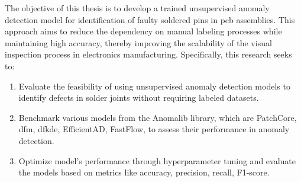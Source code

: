 The objective of this thesis is to develop a trained unsupervised anomaly detection model for identification of faulty soldered pins in \gls{pcb} assemblies. This approach aims to reduce the dependency on manual labeling processes while maintaining high accuracy, thereby improving the scalability of the visual inspection process in electronics manufacturing. Specifically, this research seeks to:

\begin{enumerate}
    \item Evaluate the feasibility of using unsupervised anomaly detection models to identify defects in solder joints without requiring labeled datasets.

    \item Benchmark various models from the Anomalib library, which are PatchCore, \gls{dfm}, \gls{dfkde}, EfficientAD, FastFlow, to assess their performance in anomaly detection.

    \item Optimize model's performance through hyperparameter tuning and evaluate the models based on metrics like accuracy, precision, recall, F1-score.
\end{enumerate}


